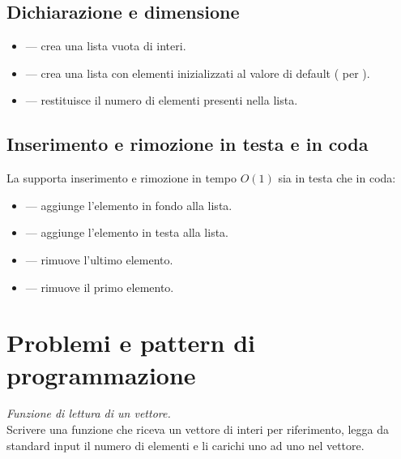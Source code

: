 \subsection{Dichiarazione e dimensione}

\begin{itemize}
    \item {} --- crea una lista vuota di interi.
    \item {} --- crea una lista con 
          elementi inizializzati al valore di default ( per
          ).
    \item {} --- restituisce il numero di elementi
          presenti nella lista.
\end{itemize}

\subsection{Inserimento e rimozione in testa e in coda}

La  supporta inserimento e rimozione in tempo $O(1)$
sia in testa che in coda:

\begin{itemize}
    \item {} --- aggiunge l'elemento 
          in fondo alla lista.
    \item {} --- aggiunge l'elemento 
          in testa alla lista.
    \item {} --- rimuove l'ultimo elemento.
    \item {} --- rimuove il primo elemento.
\end{itemize}












\section{Problemi e pattern di programmazione }


\begin{problema}
\textit{Funzione di lettura di un vettore.}\\
Scrivere una funzione  che riceva un vettore di interi per riferimento,
legga da standard input il numero di elementi e li carichi uno ad uno nel vettore.
\end{problema}


